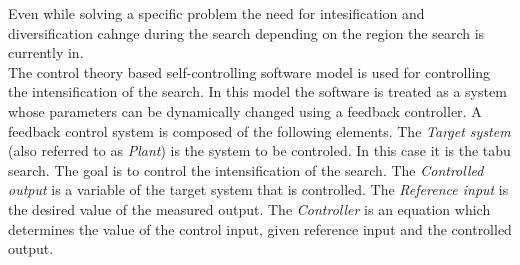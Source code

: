 \documentclass[pdftex,11pt]{article}
\begin{document}
Even while solving a specific problem the need for intesification and diversification cahnge during the search depending on the region the search is currently in.\\

The control theory based self-controlling software model is used for controlling the intensification of the search. In this model the software is treated as a system whose parameters can be dynamically changed using a feedback controller. A feedback control system is composed of the following elements. The \emph{Target system} (also referred to as \emph{Plant}) is the system to be controled. In this case it is the tabu search. The goal is to control the intensification of the search. The \emph{Controlled output} is a variable of the target system that is controlled. The \emph{Reference input} is the desired value of the measured output. The \emph{Controller} is an equation which determines the value of the control input, given reference input and the controlled output.
\end{document}
